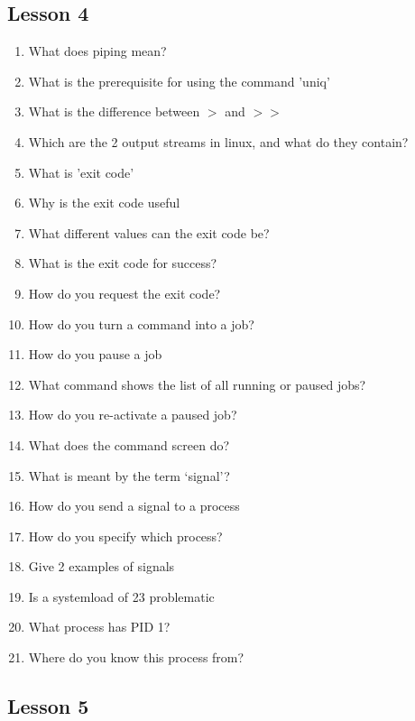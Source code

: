 \documentclass{article}
\begin{document}
\subsection{Lesson 4}

\begin{enumerate}
    \item What does piping mean?
    \item What is the prerequisite for using the command 'uniq'
    \item What is the difference between $>$ and $>>$
    \item Which are the 2 output streams in linux, and what do they contain?
    \item What is 'exit code'
    \item Why is the exit code useful
    \item What different values can the exit code be?
    \item What is the exit code for success?
    \item How do you request the exit code?
    \item How do you turn a command into a job?
    \item How do you pause a job
    \item What command shows the list of all running or paused jobs?
    \item How do you re-activate a paused job?
    \item What does the command screen do?
    \item What is meant by the term `signal'?
    \item How do you send a signal to a process
    \item How do you specify which process?
    \item Give 2 examples of signals
    \item Is a systemload of 23 problematic
    \item What process has PID 1?
    \item Where do you know this process from?
\end{enumerate}

\subsection{Lesson 5}
\end{document}
